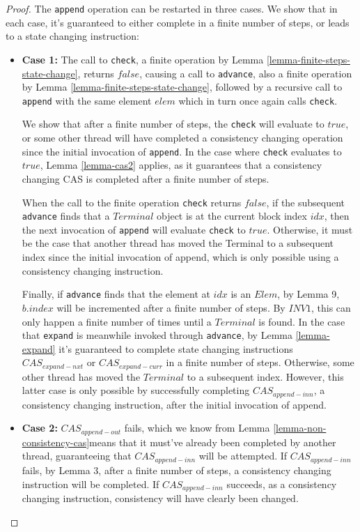 \documentclass[runningheads,a4paper]{llncs}
\begin{document}
\begin{proof}
The \verb=append= operation can be restarted in three cases. We show that in
each case, it's guaranteed to either complete in a finite number of steps,  or
leads to a state changing instruction:

\begin{itemize} 

\item \textbf{Case 1:} The call to \verb=check=, a finite operation by Lemma
\ref{lemma-finite-steps-state-change}, returns $false$,  causing a call to
\verb=advance=, also a finite operation by Lemma 
\ref{lemma-finite-steps-state-change}, followed by a recursive call to 
\verb=append= with the same element $elem$ which in turn once again calls 
\verb=check=.

We show that after a finite number of steps, the \verb=check= will evaluate to
$true$, or some other thread will have completed a consistency changing
operation since the initial invocation of \verb=append=. In the case where
\verb=check= evaluates to $true$, Lemma \ref{lemma-cas2} applies, as it
guarantees that a consistency changing CAS is completed after a finite number
of steps.

When the call to the finite operation \verb=check= returns $false$, if the
subsequent \verb=advance= finds that a $Terminal$ object is at the current
block index $idx$, then the next invocation of \verb=append= will evaluate
\verb=check= to $true$. Otherwise, it must be the case that another thread has
moved the Terminal to a subsequent index since the initial invocation of
append, which is only possible using a consistency changing instruction.

Finally, if \verb=advance= finds that the element at $idx$ is an $Elem$, by
Lemma 9, $b.index$ will be incremented after a finite number of steps. By
$INV1$, this can only happen a finite number of times until a $Terminal$ is
found. In the case that \verb=expand= is meanwhile invoked through
\verb=advance=, by Lemma \ref{lemma-expand} it's guaranteed to complete state
changing instructions $CAS_{expand-nxt}$ or $CAS_{expand-curr}$ in a finite
number of steps. Otherwise, some other thread has moved the $Terminal$ to a
subsequent index. However, this latter case is only possible by successfully
completing $CAS_{append-inn}$, a consistency changing instruction, after the
initial invocation of append.

\item \textbf{Case 2:} $CAS_{append-out}$ fails, which we know from Lemma
\ref{lemma-non-consistency-cas}means that it must've already been completed by
another thread, guaranteeing that $CAS_{append-inn}$ will be attempted. If
$CAS_{append-inn}$ fails, by Lemma 3, after a finite number of steps, a
consistency changing instruction will be completed. If $CAS_{append-inn}$
succeeds, as a consistency changing instruction, consistency will have clearly
been changed.


\end{itemize}
\end{proof}
\end{document}
